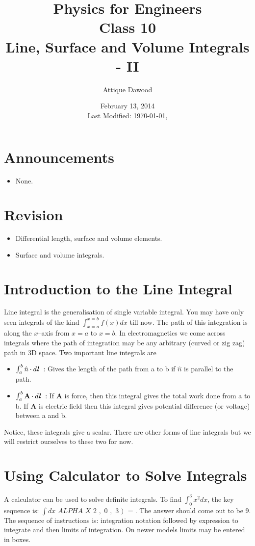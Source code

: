 \documentclass[12pt,a4paper]{article}
\title{\vspace{-2cm}Physics for Engineers\\Class 10\\Line, Surface and Volume Integrals - II}
\author{Attique Dawood}
\date{February 13, 2014\\[0.2cm] Last Modified: \today, \currenttime}
\begin{document}
\maketitle
\section{Announcements}
\begin{itemize}
\item None.
\end{itemize}
\section{Revision}
\begin{itemize}
\item Differential length, surface and volume elements.
\item Surface and volume integrals.
\end{itemize}
\section{Introduction to the Line Integral}
Line integral is the generalisation of single variable integral. You may have only seen integrals of the kind $\int_{x=a}^{x=b} f(x)dx$ till now. The path of this integration is along the $x$--axis from $x=a$ to $x=b$. In electromagnetics we come across integrals where the path of integration may be any arbitrary (curved or zig zag) path in 3D space. Two important line integrals are
\begin{itemize}
\item $\int_{a}^{b}\hat n\cdot d\textbf{\textit{l}}$~: Gives the length of the path from a to b if $\hat n$ is parallel to the path.
\item $\int_{a}^{b}\textbf{A}\cdot d\textbf{\textit{l}}$~: If \textbf{A} is force, then this integral gives the total work done from a to b. If \textbf{A} is electric field then this integral gives potential difference (or voltage) between a and b.
\end{itemize}
Notice, these integrals give a scalar. There are other forms of line integrals but we will restrict ourselves to these two for now.
\section{Using Calculator to Solve Integrals}
A calculator can be used to solve definite integrals. To find $\int_{0}^{3}x^2dx$, the key sequence is: $\boxed{\int dx}$ $\boxed{ALPHA}$ $\boxed{X}$ \fbox{\textasciicircum} $\boxed{2}$ $\boxed{,}$ $\boxed{0}$ $\boxed{,}$ $\boxed{3}$ $\boxed{)}$ $\boxed{=}$. The answer should come out to be 9. The sequence of instructions is: integration notation followed by expression to integrate and then limits of integration. On newer models limits may be entered in boxes.
\end{document}
